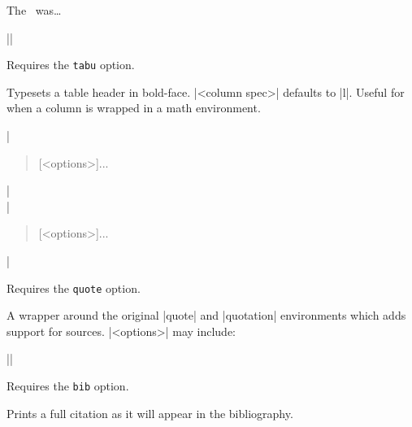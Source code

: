 \documentclass{ltxguidex}
\newcommand{\reqopt}[1]{Requires the \texttt{\color{magenta}#1} option.\par}
\begin{document}
\begin{LTXexample}
\xyz

The \ussr\ was\dots
\end{LTXexample}

\begin{desc}
||
\end{desc}

\reqopt{tabu} Typesets a table header in bold-face. |<column spec>| defaults
to |l|. Useful for when a column is wrapped in a math environment.

\begin{desc}
|\begin{quote}[<options>]...\end{quote}|\\
|\begin{quotation}[<options>]...\end{quotation}|\\
\end{desc}

\reqopt{quote} A wrapper around the original |quote| and |quotation|
environments which adds support for sources. |<options>| may include:

\begin{desc}
||
\end{desc}

\reqopt{bib} Prints a full citation as it will appear in the bibliography.
\end{document}
